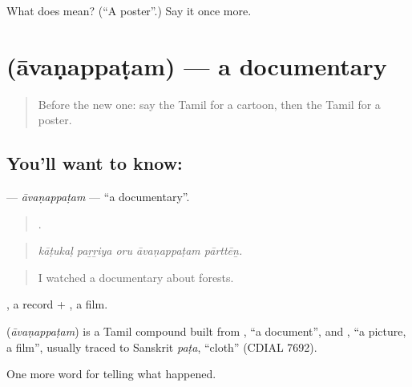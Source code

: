 \begin{tcolorbox}[breakable,colback=teal!4,colframe=teal!35!black,title={Before you move on}]
What does  mean? (\textquotedblleft{}A poster\textquotedblright{}.) Say it once more.
\end{tcolorbox}
\section[\texorpdfstring{\ta{ஆவணப்படம்} (āvaṇappaṭam)}{ஆவணப்படம் (āvaṇappaṭam)}]{ (āvaṇappaṭam) — a documentary}

\label{lesson:TA-C310-avanappatam}



\begin{quote}
Before the new one: say the Tamil for a cartoon, then the Tamil for a poster.
\end{quote}

\subsection*{You'll want to know: }
\textbf{} — \emph{āvaṇappaṭam} — \textquotedblleft{}a documentary\textquotedblright{}.

\begin{quote}
    .
\end{quote}

\begin{quote}
\emph{kāṭukaḷ paṟṟiya oru āvaṇappaṭam pārttēṉ.}
\end{quote}

\begin{quote}
I watched a documentary about forests.
\end{quote}

, a record + , a film.

\begin{cousinweb}
\textbf{} (\emph{āvaṇappaṭam}) is a Tamil compound built from , \textquotedblleft{}a document\textquotedblright{}, and , \textquotedblleft{}a picture, a film\textquotedblright{}, usually traced to Sanskrit \emph{paṭa}, \textquotedblleft{}cloth\textquotedblright{} (CDIAL 7692).
\end{cousinweb}

\begin{grammarlens}[title={What you've built}]
One more word for telling what happened.
\end{grammarlens}

